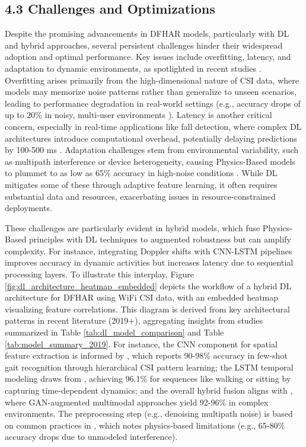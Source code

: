 \documentclass[Afour,sageh,times]{sagej}
\begin{document}
\subsection{4.3 Challenges and Optimizations}
\label{subsec:challenges_optimizations}

Despite the promising advancements in DFHAR models, particularly with DL and hybrid approaches, several persistent challenges hinder their widespread adoption and optimal performance. Key issues include overfitting, latency, and adaptation to dynamic environments, as spotlighted in recent studies \citep{guo2019robust, yang2022deep}. Overfitting arises primarily from the high-dimensional nature of CSI data, where models may memorize noise patterns rather than generalize to unseen scenarios, leading to performance degradation in real-world settings (e.g., accuracy drops of up to 20\% in noisy, multi-user environments \citep{guo2019robust}). Latency is another critical concern, especially in real-time applications like fall detection, where complex DL architectures introduce computational overhead, potentially delaying predictions by 100-500 ms \citep{yang2022deep}. Adaptation challenges stem from environmental variability, such as multipath interference or device heterogeneity, causing Physics-Based models to plummet to as low as 65\% accuracy in high-noise conditions \citep{guo2019robust}. While DL mitigates some of these through adaptive feature learning, it often requires substantial data and resources, exacerbating issues in resource-constrained deployments.

These challenges are particularly evident in hybrid models, which fuse Physics-Based principles with DL techniques to augmented robustness but can amplify complexity. For instance, integrating Doppler shifts with CNN-LSTM pipelines improves accuracy in dynamic activities but increases latency due to sequential processing layers. To illustrate this interplay, Figure \ref{fig:dl_architecture_heatmap_embedded} depicts the workflow of a hybrid DL architecture for DFHAR using WiFi CSI data, with an embedded heatmap visualizing feature correlations. This diagram is derived from key architectural patterns in recent literature (2019+), aggregating insights from studies summarized in Table \ref{tab:dl_model_comparison} and Table \ref{tab:model_summary_2019}. For instance, the CNN component for spatial feature extraction is informed by \citep{wang2022caution}, which reports 90-98\% accuracy in few-shot gait recognition through hierarchical CSI pattern learning; the LSTM temporal modeling draws from \citep{chen2018wifi}, achieving 96.1\% for sequences like walking or sitting by capturing time-dependent dynamics; and the overall hybrid fusion aligns with \citep{wang2021multimodal}, where GAN-augmented multimodal approaches yield 92-96\% in complex environments. The preprocessing step (e.g., denoising multipath noise) is based on common practices in \citep{guo2019robust}, which notes physics-based limitations (e.g., 65-80\% accuracy drops due to unmodeled interference).
\end{document}

